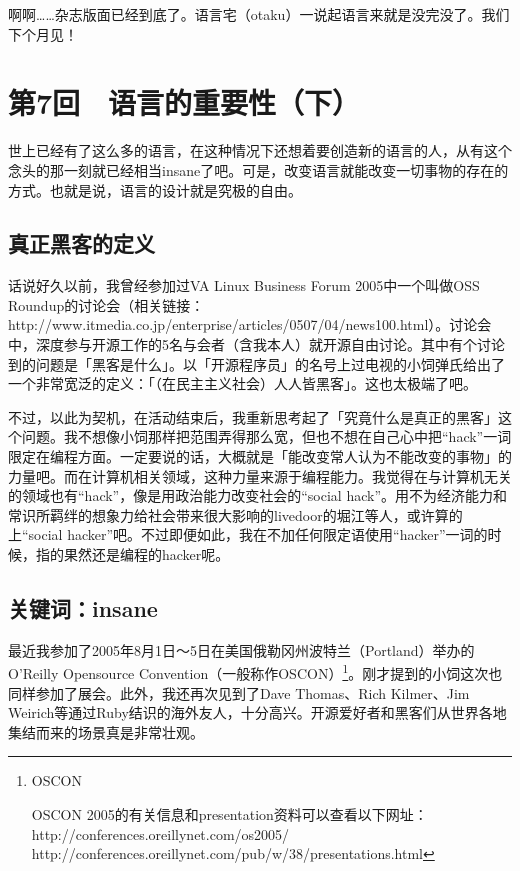 \documentclass[a4paper,12pt]{article}
\begin{document}
啊啊……杂志版面已经到底了。语言宅（otaku）一说起语言来就是没完没了。我们下个月见！


\section{第7回　语言的重要性（下）}

世上已经有了这么多的语言，在这种情况下还想着要创造新的语言的人，从有这个念头的那一刻就已经相当insane了吧。可是，改变语言就能改变一切事物的存在的方式。也就是说，语言的设计就是究极的自由。

\subsection{真正黑客的定义}

话说好久以前，我曾经参加过VA Linux Business Forum 2005中一个叫做OSS Roundup的讨论会（相关链接：http://www.itmedia.co.jp/enterprise/articles/0507/04/news100.html）。讨论会中，深度参与开源工作的5名与会者（含我本人）就开源自由讨论。其中有个讨论到的问题是「黑客是什么」。以「开源程序员」的名号上过电视的小饲弹氏给出了一个非常宽泛的定义：「（在民主主义社会）人人皆黑客」。这也太极端了吧。

不过，以此为契机，在活动结束后，我重新思考起了「究竟什么是真正的黑客」这个问题。我不想像小饲那样把范围弄得那么宽，但也不想在自己心中把“hack”一词限定在编程方面。一定要说的话，大概就是「能改变常人认为不能改变的事物」的力量吧。而在计算机相关领域，这种力量来源于编程能力。我觉得在与计算机无关的领域也有“hack”，像是用政治能力改变社会的“social hack”。用不为经济能力和常识所羁绊的想象力给社会带来很大影响的livedoor的堀江等人，或许算的上“social hacker”吧。不过即便如此，我在不加任何限定语使用“hacker”一词的时候，指的果然还是编程的hacker呢。

\subsection{关键词：insane}

最近我参加了2005年8月1日～5日在美国俄勒冈州波特兰（Portland）举办的O'Reilly Opensource Convention（一般称作OSCON）\footnote{OSCON

  OSCON 2005的有关信息和presentation资料可以查看以下网址：
  http://conferences.oreillynet.com/os2005/
  http://conferences.oreillynet.com/pub/w/38/presentations.html
}。刚才提到的小饲这次也同样参加了展会。此外，我还再次见到了Dave Thomas、Rich Kilmer、Jim Weirich等通过Ruby结识的海外友人，十分高兴。开源爱好者和黑客们从世界各地集结而来的场景真是非常壮观。
\end{document}
